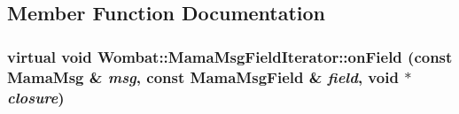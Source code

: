 \subsection{Member Function Documentation}
\hypertarget{classWombat_1_1MamaMsgFieldIterator_ace48136b8207b578bc3d0102758bbc06}{
\subsubsection[{onField}]{\setlength{\rightskip}{0pt plus 5cm}virtual void Wombat::MamaMsgFieldIterator::onField (const {\bf MamaMsg} \& {\em msg}, \/  const {\bf MamaMsgField} \& {\em field}, \/  void $\ast$ {\em closure})}}
\label{classWombat_1_1MamaMsgFieldIterator_ace48136b8207b578bc3d0102758bbc06}
